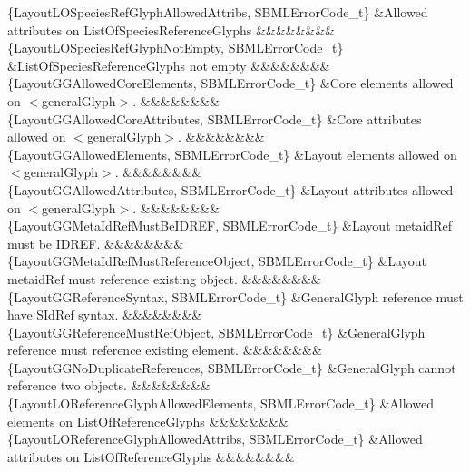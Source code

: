 \begin{DoxyParagraph}{}
\begin{longtabu}
\{Layout\+L\+O\+Species\+Ref\+Glyph\+Allowed\+Attribs, S\+B\+M\+L\+Error\+Code\+\_\+t\} &Allowed attributes on List\+Of\+Species\+Reference\+Glyphs &&&&&&&&\\
\{Layout\+L\+O\+Species\+Ref\+Glyph\+Not\+Empty, S\+B\+M\+L\+Error\+Code\+\_\+t\} &List\+Of\+Species\+Reference\+Glyphs not empty &&&&&&&&\\
\{Layout\+G\+G\+Allowed\+Core\+Elements, S\+B\+M\+L\+Error\+Code\+\_\+t\} &Core elements allowed on {\ttfamily $<$general\+Glyph$>$}. &&&&&&&&\\
\{Layout\+G\+G\+Allowed\+Core\+Attributes, S\+B\+M\+L\+Error\+Code\+\_\+t\} &Core attributes allowed on {\ttfamily $<$general\+Glyph$>$}. &&&&&&&&\\
\{Layout\+G\+G\+Allowed\+Elements, S\+B\+M\+L\+Error\+Code\+\_\+t\} &Layout elements allowed on {\ttfamily $<$general\+Glyph$>$}. &&&&&&&&\\
\{Layout\+G\+G\+Allowed\+Attributes, S\+B\+M\+L\+Error\+Code\+\_\+t\} &Layout attributes allowed on {\ttfamily $<$general\+Glyph$>$}. &&&&&&&&\\
\{Layout\+G\+G\+Meta\+Id\+Ref\+Must\+Be\+I\+D\+R\+EF, S\+B\+M\+L\+Error\+Code\+\_\+t\} &Layout \textquotesingle{}metaid\+Ref\textquotesingle{} must be I\+D\+R\+EF. &&&&&&&&\\
\{Layout\+G\+G\+Meta\+Id\+Ref\+Must\+Reference\+Object, S\+B\+M\+L\+Error\+Code\+\_\+t\} &Layout \textquotesingle{}metaid\+Ref\textquotesingle{} must reference existing object. &&&&&&&&\\
\{Layout\+G\+G\+Reference\+Syntax, S\+B\+M\+L\+Error\+Code\+\_\+t\} &General\+Glyph \textquotesingle{}reference\textquotesingle{} must have S\+Id\+Ref syntax. &&&&&&&&\\
\{Layout\+G\+G\+Reference\+Must\+Ref\+Object, S\+B\+M\+L\+Error\+Code\+\_\+t\} &General\+Glyph \textquotesingle{}reference\textquotesingle{} must reference existing element. &&&&&&&&\\
\{Layout\+G\+G\+No\+Duplicate\+References, S\+B\+M\+L\+Error\+Code\+\_\+t\} &General\+Glyph cannot reference two objects. &&&&&&&&\\
\{Layout\+L\+O\+Reference\+Glyph\+Allowed\+Elements, S\+B\+M\+L\+Error\+Code\+\_\+t\} &Allowed elements on List\+Of\+Reference\+Glyphs &&&&&&&&\\
\{Layout\+L\+O\+Reference\+Glyph\+Allowed\+Attribs, S\+B\+M\+L\+Error\+Code\+\_\+t\} &Allowed attributes on List\+Of\+Reference\+Glyphs &&&&&&&&\\

\end{longtabu}
\end{DoxyParagraph}
